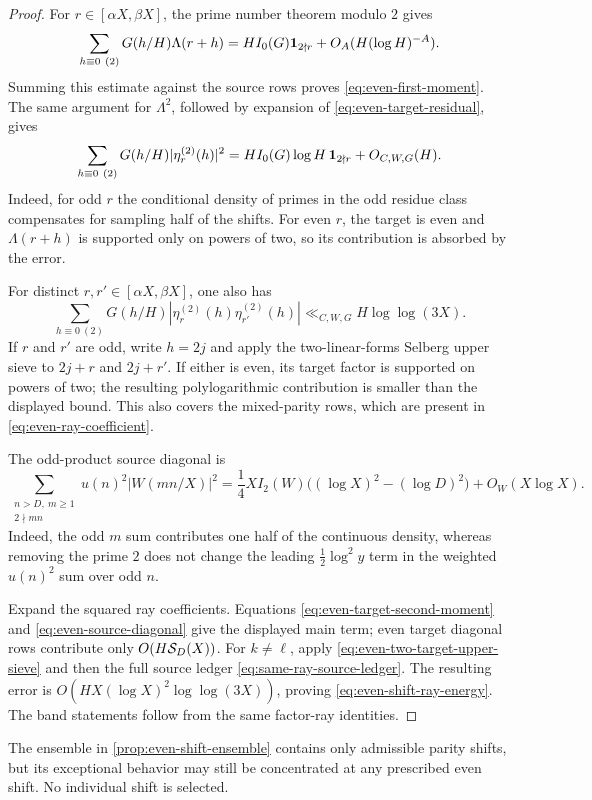 \begin{proof}
For $r\in[\alpha X,\beta X]$, the prime number theorem modulo $2$ gives
\begin{equation}
 \sum_{h\equiv0\ (2)}G(h/H)\Lambda(r+h)
 =H I_0(G)\one_{2\nmid r}+O_A(H(\log H)^{-A}).
 \label{eq:even-target-first-moment}
\end{equation}
Summing this estimate against the source rows proves
\eqref{eq:even-first-moment}.  The same argument for $\Lambda^2$, followed
by expansion of \eqref{eq:even-target-residual}, gives
\begin{equation}
 \sum_{h\equiv0\ (2)}G(h/H)|\eta_r^{(2)}(h)|^2
 =H I_0(G)\log H\,\one_{2\nmid r}+O_{C,W,G}(H).
 \label{eq:even-target-second-moment}
\end{equation}
Indeed, for odd $r$ the conditional density of primes in the odd residue
class compensates for sampling half of the shifts.  For even $r$, the
target is even and $\Lambda(r+h)$ is supported only on powers of two, so
its contribution is absorbed by the error.

For distinct $r,r'\in[\alpha X,\beta X]$, one also has
\begin{equation}
 \sum_{h\equiv0\ (2)}G(h/H)
 |\eta_r^{(2)}(h)\eta_{r'}^{(2)}(h)|
 \ll_{C,W,G}H\log\log(3X).
 \label{eq:even-two-target-upper-sieve}
\end{equation}
If $r$ and $r'$ are odd, write $h=2j$ and apply the two-linear-forms
Selberg upper sieve to $2j+r$ and $2j+r'$.  If either is even, its target
factor is supported on powers of two; the resulting polylogarithmic
contribution is smaller than the displayed bound.  This also covers the
mixed-parity rows, which are present in \eqref{eq:even-ray-coefficient}.

The odd-product source diagonal is
\begin{equation}
 \sum_{\substack{n>D,\ m\geq1\\2\nmid mn}}
 u(n)^2|W(mn/X)|^2
 =\frac14X I_2(W)
 \bigl((\log X)^2-(\log D)^2\bigr)+O_W(X\log X).
 \label{eq:even-source-diagonal}
\end{equation}
Indeed, the odd $m$ sum contributes one half of the continuous density,
whereas removing the prime $2$ does not change the leading
$\frac12\log^2 y$ term in the weighted $u(n)^2$ sum over odd $n$.

Expand the squared ray coefficients.  Equations
\eqref{eq:even-target-second-moment} and
\eqref{eq:even-source-diagonal} give the displayed main term; even target
diagonal rows contribute only $O(H\mathcal S_D(X))$.  For $k\ne\ell$, apply
\eqref{eq:even-two-target-upper-sieve} and then the full source ledger
\eqref{eq:same-ray-source-ledger}.  The resulting error is
$O(HX(\log X)^2\log\log(3X))$, proving
\eqref{eq:even-shift-ray-energy}.  The band statements follow from the
same factor-ray identities.
\end{proof}

\begin{remark}
The ensemble in \cref{prop:even-shift-ensemble} contains only admissible
parity shifts, but its exceptional behavior may still be concentrated at
any prescribed even shift.  No individual shift is selected.
\end{remark}
